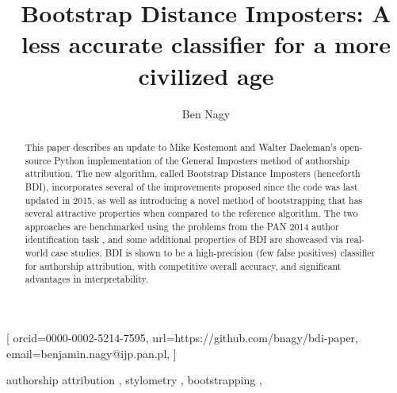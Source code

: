 \documentclass[
    hf
]{ceurart}
\begin{document}

\conference{}
\title{Bootstrap Distance Imposters: A less accurate classifier for a more civilized age}


\author[1]{Ben Nagy}[%
    orcid=0000-0002-5214-7595,
    url=https://github.com/bnagy/bdi-paper,
    email=benjamin.nagy@ijp.pan.pl,
]
\address[1]{Institute of Polish Language, Polish Academy of Sciences (IJP PAN)\\
    Adama Mickiewicz 31\\
    Kraków, Poland}
\begin{abstract}
    This paper describes an update to Mike Kestemont and Walter Daeleman's
    open-source Python implementation of the General Imposters method of
    authorship attribution. The new algorithm, called Bootstrap Distance
    Imposters (henceforth BDI), incorporates several of the improvements
    proposed since the code was last updated in 2015, as well as introducing a
    novel method of bootstrapping that has several attractive properties when
    compared to the reference algorithm. The two approaches are benchmarked
    using the problems from the PAN 2014 author identification task
    \cite{pan_2014}, and some additional properties of BDI are showcased via
    real-world case studies. BDI is shown to be a high-precision (few false
    positives) classifier for authorship attribution, with competitive overall
    accuracy, and significant advantages in interpretability.
\end{abstract}

\begin{keywords}
    authorship attribution \sep
    stylometry \sep
    bootstrapping \sep
\end{keywords}
\end{document}
